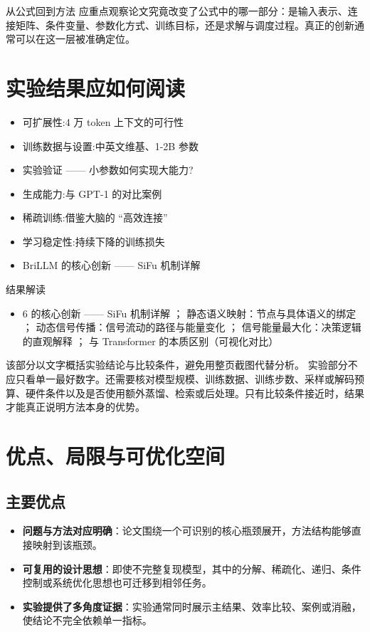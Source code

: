 \documentclass[UTF8,11pt,a4paper]{ctexart}
\newcommand{\term}[1]{\textbf{\textcolor{mainblue}{#1}}}
\begin{document}
\begin{keybox}{从公式回到方法}
应重点观察论文究竟改变了公式中的哪一部分：是输入表示、连接矩阵、条件变量、参数化方式、训练目标，还是求解与调度过程。真正的创新通常可以在这一层被准确定位。
\end{keybox}


\section{实验结果应如何阅读}
\begin{itemize}
\item 可扩展性:4 万 token 上下文的可行性
\item 训练数据与设置:中英文维基、1-2B 参数
\item 实验验证 —— 小参数如何实现大能力?
\item 生成能力:与 GPT-1 的对比案例
\item 稀疏训练:借鉴大脑的 “高效连接”
\item 学习稳定性:持续下降的训练损失
\item BriLLM 的核心创新 —— SiFu 机制详解
\end{itemize}

\begin{notebox}{结果解读}
\begin{itemize}
\item 6 的核心创新 —— SiFu 机制详解 ； 静态语义映射：节点与具体语义的绑定 ； 动态信号传播：信号流动的路径与能量变化 ； 信号能量最大化：决策逻辑的直观解释 ； 与 Transformer 的本质区别（可视化对比）
\end{itemize}
\end{notebox}

该部分以文字概括实验结论与比较条件，避免用整页截图代替分析。
实验部分不应只看单一最好数字。还需要核对模型规模、训练数据、训练步数、采样或解码预算、硬件条件以及是否使用额外蒸馏、检索或后处理。只有比较条件接近时，结果才能真正说明方法本身的优势。

\section{优点、局限与可优化空间}
\subsection{主要优点}
\begin{itemize}
\item \term{问题与方法对应明确}：论文围绕一个可识别的核心瓶颈展开，方法结构能够直接映射到该瓶颈。
\item \term{可复用的设计思想}：即使不完整复现模型，其中的分解、稀疏化、递归、条件控制或系统优化思想也可迁移到相邻任务。
\item \term{实验提供了多角度证据}：实验通常同时展示主结果、效率比较、案例或消融，使结论不完全依赖单一指标。
\end{itemize}
\end{document}
